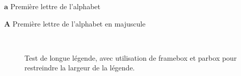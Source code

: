 \documentclass[letterpaper
, twoside
, 12pt
,these
,francais
,creativecommons,hyperref
]{thETS}
\begin{document}
\begin{listofsymbols}[3cm]
\item [$\textbf{a}$] Première lettre de l'alphabet
\item [$\textbf{A}$] Première lettre de l'alphabet en majuscule
\end{listofsymbols}


\cleardoublepage


\reversemarginpar


\begin{introduction}

\lipsum[1] %

\begin{figure}
	\centering %
	 \\ \parbox{0.75\textwidth}{\caption{Test de longue légende, avec utilisation de framebox et parbox pour restreindre la largeur de la légende.}\label{fig:vueEts}} %
\end{figure}

\lipsum[1] %


\end{introduction}
\end{document}
